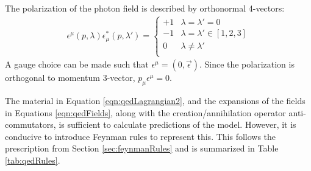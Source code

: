 The polarization of the photon field is described by orthonormal 4-vectors:
\begin{equation}\begin{split}
\epsilon^\mu(p,\lambda)\epsilon^*_\mu(p,\lambda') = \begin{cases}
    +1 &\lambda=\lambda'=0\\
    -1 &\lambda=\lambda'\in[1,2,3]\\
     0 &\lambda\ne\lambda'\\
\end{cases}
\end{split}\end{equation}
A gauge choice can be made such that $\epsilon^\mu=(0,\vec{\epsilon})$.
Since the polarization is orthogonal to momentum 3-vector, $p_\mu\epsilon^\mu=0$.

The material in Equation \ref{eqn:qedLagrangian2}, and the expansions of the fields in Equations \ref{eqn:qedFields}, along with the creation/annihilation operator anti-commutators, is sufficient to calculate predictions of the model.
However, it is conducive to introduce Feynman rules to represent this.
This follows the prescription from Section \ref{sec:feynmanRules} and is summarized in Table \ref{tab:qedRules}.


